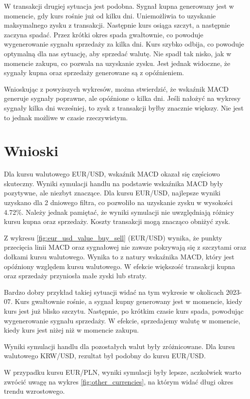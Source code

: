 \documentclass[12pt, a4paper]{article}
\begin{document}
W transakcji drugiej sytuacja jest podobna. Sygnał kupna generowany jest w momencie,
gdy kurs rośnie już od kilku dni. Uniemożliwia to uzyskanie maksymalnego zysku z transakcji.
Następnie kurs osiąga szczyt, a następnie zaczyna spadać. Przez krótki okres
spada gwałtownie, co powoduje wygenerowanie sygnału sprzedaży za kilka dni. Kurs szybko
odbija, co powoduje optymalną dla nas sytuację, aby sprzedać walutę.
Nie spadł tak nisko, jak w momencie zakupu, co pozwala na uzyskanie zysku.
Jest jednak widoczne, że sygnały kupna oraz sprzedaży generowane są z opóźnieniem.

Wnioskując z powyższych wykresów, można stwierdzić, że wskaźnik MACD generuje
sygnały poprawne, ale opóźnione o kilka dni. Jeśli nałożyć na wykresy sygnały
kilka dni wcześniej, to zysk z transakcji byłby znacznie większy. Nie jest
to jednak możliwe w czasie rzeczywistym.



\section{Wnioski}
Dla kursu walutowego EUR/USD, wskaźnik MACD okazał się częściowo skuteczny.
Wyniki symulacji handlu na podstawie wskaźnika MACD były pozytywne, ale niezbyt znaczące.
Dla kursu EUR/USD, najlepsze wyniki uzyskano dla 2 dniowego filtra,
co pozwoliło na uzyskanie zysku w wysokości 4.72\%. Należy jednak pamiętać, że wyniki symulacji
nie uwzględniają różnicy kursu kupna oraz sprzedaży. Koszty transakcji mogą znacząco obniżyć zysk.

Z wykresu \ref{fig:eur_usd_value_buy_sell} (EUR/USD) wynika, że punkty przecięcia linii MACD oraz sygnałowej
nie zawsze pokrywają się z szczytami oraz dołkami kursu walutowego. Wynika to z natury wskaźnika MACD,
który jest opóźniony względem kursu walutowego. W efekcie większość transakcji kupna oraz sprzedaży
przyniosła małe zyski lub straty.

Bardzo dobry przykład takiej sytuacji widać na tym wykresie w okolicach 2023-07. Kurs
gwałtownie rośnie, a sygnał kupny generowany jest w momencie, kiedy kurs jest już blisko szczytu.
Następnie, po krótkim czasie kurs spada, powodując wygenerowanie sygnału sprzedaży.
W efekcie, sprzedajemy walutę w momencie, kiedy kurs jest niżej niż w momencie zakupu.

Wyniki symulacji handlu dla pozostałych walut były zróżnicowane. Dla kursu walutowego KRW/USD,
rezultat był podobny do kursu EUR/USD.

W przypadku kursu EUR/PLN, wyniki symulacji były lepsze, aczkolwiek warto zwrócić uwagę na
wykres \ref{fig:other_currencies}, na którym widać długi okres trendu wzrostowego.
\end{document}
